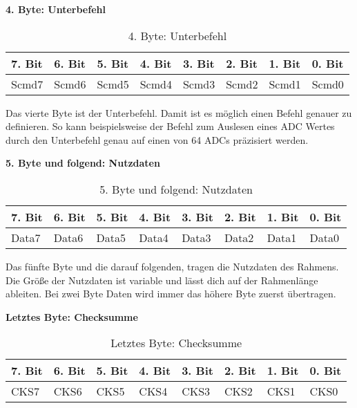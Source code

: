 \textbf{4. Byte: Unterbefehl}

\begin{table}[H]
\begin{center}
\begin{tabularx}{\textwidth}{|X|X|X|X|X|X|X|X|}\hline
 7. Bit & 6. Bit & 5. Bit & 4. Bit & 3. Bit & 2. Bit & 1. Bit & 0. Bit\\ \hline
 Scmd7 & Scmd6 & Scmd5 & Scmd4 & Scmd3 & Scmd2 & Scmd1 & Scmd0\\ \hline
\end{tabularx}
\caption{4. Byte: Unterbefehl}
\label{table_4Byte}
\end{center}
\end{table}

Das vierte Byte ist der Unterbefehl. Damit ist es möglich einen Befehl genauer zu definieren. So kann beispielsweise der Befehl zum Auslesen eines \ac{ADC} Wertes durch den Unterbefehl genau auf einen von 64 \acp{ADC} präzisiert werden.


\textbf{5. Byte und folgend: Nutzdaten}

\begin{table}[H]
\begin{center}
\begin{tabularx}{\textwidth}{|X|X|X|X|X|X|X|X|}\hline
 7. Bit & 6. Bit & 5. Bit & 4. Bit & 3. Bit & 2. Bit & 1. Bit & 0. Bit\\ \hline
 Data7 & Data6 & Data5 & Data4 & Data3 & Data2 & Data1 & Data0\\ \hline
\end{tabularx}
\caption{5. Byte und folgend: Nutzdaten}
\label{table_5Byte}
\end{center}
\end{table}

Das fünfte Byte und die darauf folgenden, tragen die Nutzdaten des Rahmens. Die Größe der Nutzdaten ist variable und lässt dich auf der Rahmenlänge ableiten. Bei zwei Byte Daten wird immer das höhere Byte zuerst übertragen.


\textbf{Letztes Byte: Checksumme}

\begin{table}[H]
\begin{center}
\begin{tabularx}{\textwidth}{|X|X|X|X|X|X|X|X|}\hline
 7. Bit & 6. Bit & 5. Bit & 4. Bit & 3. Bit & 2. Bit & 1. Bit & 0. Bit\\ \hline
 CKS7 & CKS6 & CKS5 & CKS4 & CKS3 & CKS2 & CKS1 & CKS0\\ \hline
\end{tabularx}
\caption{Letztes Byte: Checksumme}
\label{table_LastByte}
\end{center}
\end{table}


